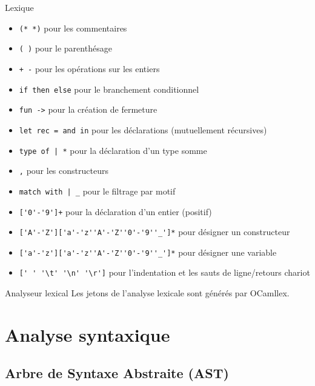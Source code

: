 \documentclass{beamer}
\begin{document}
\begin{frame}[fragile]{Lexique}
    \begin{itemize}
        \item \lstinline{(* *)} pour les commentaires
        \item \lstinline{( )} pour le parenthésage
        \item \lstinline{+ -} pour les opérations sur les entiers
        \item \lstinline{if then else} pour le branchement conditionnel
        \item \lstinline{fun ->} pour la création de fermeture
        \item \lstinline{let rec = and in} pour les déclarations (mutuellement récursives)
        \item \lstinline{type of | *} pour la déclaration d'un type somme
        \item \lstinline{,} pour les constructeurs
        \item \lstinline{match with | _} pour le filtrage par motif
        \item \lstinline{['0'-'9']+} pour la déclaration d'un entier (positif)
        \item \lstinline{['A'-'Z']['a'-'z''A'-'Z''0'-'9''_']*} pour désigner un constructeur
        \item \lstinline{['a'-'z']['a'-'z''A'-'Z''0'-'9''_']*} pour désigner une variable
        \item \lstinline{[' ' '\t' '\n' '\r']} pour l'indentation et les sauts de ligne/retours chariot
    \end{itemize}
\end{frame}

\begin{frame}{Analyseur lexical}
    Les jetons de l'analyse lexicale sont générés par OCamllex.
\end{frame}


\section{Analyse syntaxique}

\subsection{Arbre de Syntaxe Abstraite (AST)}
\end{document}
